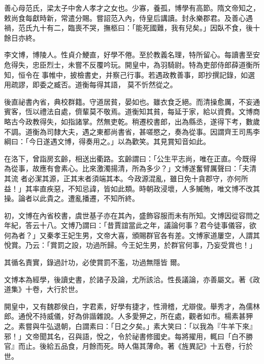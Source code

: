 \begin{pinyinscope}
 善心母范氏，梁太子中舍人孝才之女也。少寡，養孤，博學有高節。隋文帝知之，敕尚食每獻時新，常遣分賜。嘗詔范入內，侍皇后講讀。封永樂郡君。及善心遇禍，范氏九十有二，臨喪不哭，撫柩曰：「能死國難，我有兒矣。」因臥不食，後十餘日亦終。



 李文博，博陵人。性貞介鯁直，好學不倦。至於教義名理，特所留心。每讀書至安危得失，忠臣烈士，未嘗不反覆吟玩。開皇中，為羽騎尉。特為吏部侍郎薛道衡所知，恒令在事帷中，披檢書史，并察己行事。若遇政教善事，即抄撰記錄，如選用疏謬，即委之臧否。道衡每得其語，
 莫不忻然從之。



 後直祕書內省，典校群籍。守道居貧，晏如也。雖衣食乏絕。而清操愈厲，不妄通賓客，恆以禮法自處，儕輩莫不敬焉。道衡知其貧，每延于家，給以資費。文博商略古今政教得失，如指諸掌。然無吏乾。稍遷校書郎，出為縣丞，遂得下考，數歲不調。道衡為司隸大夫，遇之東都尚書省，甚嗟愍之，奏為從事。因謂齊王司馬李綱曰：「今日遂遇文博，得奏用之。」以為歡笑。其見賞知音如此。



 在洛下，曾詣房玄齡，相送出衢路。玄齡謂曰：「公生平志尚，唯在正直。今既得為從事，故應有會素心。比來激濁揚清，所為多少？」文博遂奮臂厲聲曰：「夫清其流
 者必潔其源，正其末者須端其本。今政源混亂，雖日免十貪郡守，亦何所益！」其率直疾惡，不知忌諱，皆如此類。時朝政浸壞，人多贓賄，唯文博不改其操。論者以此貴之。遭亂播遷，不知所終。



 初，文博在內省校書，虞世基子亦在其內，盛飾容服而未有所知。文博因從容問之年紀，答云十八。文博乃謂曰：「昔賈誼當此之年，議論何事？君今徒事儀容，欲何為者？」又秦孝王妃生男，文帝大喜，頒賜群官各有差。文博家道屢空，人謂其悅賞。乃云：「賞罰之設，功過所歸。今王妃生男，於群官何事，乃妄受賞也！」



 其循名責實，錄過計功，必使賞罰不濫，功過無隱皆
 爾。



 文博本為經學，後讀史書，於諸子及論，尤所該洽。性長議論，亦善屬文。著《政道集》十卷，大行於世。



 開皇中，又有魏郡侯白，字君素，好學有捷才，性滑稽，尤辯俊。舉秀才，為儒林郎。通侻不持威儀，好為俳諧雜說。人多愛狎之，所在處，觀者如市。楊素甚狎之。素嘗與牛弘退朝，白謂素曰：「日之夕矣。」素大笑曰：「以我為『牛羊下來』邪！」文帝聞其名，召與語，悅之，令於祕書修國史。每將擢用，輒曰「白不勝官』而止。後給五品食，月餘而死。時人傷其薄命。著《旌異記》十五卷，行於世。




\end{pinyinscope}
